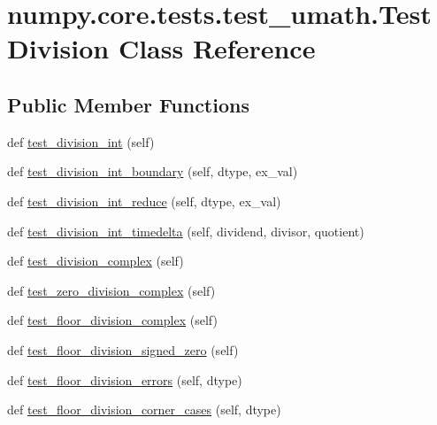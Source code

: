 \hypertarget{classnumpy_1_1core_1_1tests_1_1test__umath_1_1TestDivision}{}\section{numpy.\+core.\+tests.\+test\+\_\+umath.\+Test\+Division Class Reference}
\label{classnumpy_1_1core_1_1tests_1_1test__umath_1_1TestDivision}
\subsection*{Public Member Functions}
\begin{DoxyCompactItemize}
\item 
def \hyperlink{classnumpy_1_1core_1_1tests_1_1test__umath_1_1TestDivision_a1972d1cf8a0eab71041a0241c0e0b1d0}{test\+\_\+division\+\_\+int} (self)
\item 
def \hyperlink{classnumpy_1_1core_1_1tests_1_1test__umath_1_1TestDivision_ab5afdacace27c36d972f143667912ec3}{test\+\_\+division\+\_\+int\+\_\+boundary} (self, dtype, ex\+\_\+val)
\item 
def \hyperlink{classnumpy_1_1core_1_1tests_1_1test__umath_1_1TestDivision_ae13784571278b56697a48c274ed99741}{test\+\_\+division\+\_\+int\+\_\+reduce} (self, dtype, ex\+\_\+val)
\item 
def \hyperlink{classnumpy_1_1core_1_1tests_1_1test__umath_1_1TestDivision_ad41ef1bb4f471b3dd046598d629f5690}{test\+\_\+division\+\_\+int\+\_\+timedelta} (self, dividend, divisor, quotient)
\item 
def \hyperlink{classnumpy_1_1core_1_1tests_1_1test__umath_1_1TestDivision_ab82075b6d54b780717b5ad580d25afdd}{test\+\_\+division\+\_\+complex} (self)
\item 
def \hyperlink{classnumpy_1_1core_1_1tests_1_1test__umath_1_1TestDivision_a15c1057333c127ff8f731fc50c9db031}{test\+\_\+zero\+\_\+division\+\_\+complex} (self)
\item 
def \hyperlink{classnumpy_1_1core_1_1tests_1_1test__umath_1_1TestDivision_aaaef060de9aef45ca23c0c8c0afd7537}{test\+\_\+floor\+\_\+division\+\_\+complex} (self)
\item 
def \hyperlink{classnumpy_1_1core_1_1tests_1_1test__umath_1_1TestDivision_a32e46cd2608cb3a06a40909641b198fe}{test\+\_\+floor\+\_\+division\+\_\+signed\+\_\+zero} (self)
\item 
def \hyperlink{classnumpy_1_1core_1_1tests_1_1test__umath_1_1TestDivision_a7d3b3657e81b3f657fa0eb8b5f12e37f}{test\+\_\+floor\+\_\+division\+\_\+errors} (self, dtype)
\item 
def \hyperlink{classnumpy_1_1core_1_1tests_1_1test__umath_1_1TestDivision_a99e35930e08b97cbb46138f5e9e1a8d7}{test\+\_\+floor\+\_\+division\+\_\+corner\+\_\+cases} (self, dtype)
\end{DoxyCompactItemize}


